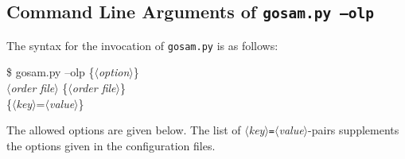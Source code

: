 \subsection{Command Line Arguments of \texttt{gosam.py --olp}}
The syntax for the invocation of \texttt{gosam.py} is as follows:
\begin{example}
\$ gosam.py --olp \{$\langle$\textit{option}$\rangle$\}\\
    \contl $\langle$\textit{order file}$\rangle$
    \{$\langle$\textit{order file}$\rangle$\} \\
    \contl \{$\langle$\textit{key}$\rangle$=$\langle$\textit{value}$\rangle$\}
\end{example}
The allowed options are given below. The list of
$\langle$\textit{key}$\rangle$\texttt{=}$\langle$\textit{value}$\rangle$-pairs
supplements the options given in the configuration files.
